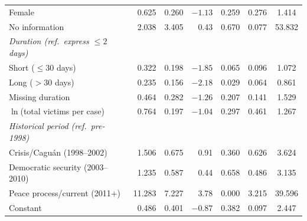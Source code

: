 {\begin{longtable}{@{}l r r r r c c@{}}
Female & 0.625 & 0.260 & $-1.13$ & 0.259 & 0.276 & 1.414 \\
No information & 2.038 & 3.405 & 0.43 & 0.670 & 0.077 & 53.832 \\
\addlinespace
\textit{Duration (ref.\ express $\le 2$ days)} & & & & & & \\
Short ($\le 30$ days) & 0.322 & 0.198 & $-1.85$ & 0.065 & 0.096 & 1.072 \\
Long ($>30$ days) & 0.235 & 0.156 & $-2.18$ & 0.029 & 0.064 & 0.861 \\
Missing duration & 0.464 & 0.282 & $-1.26$ & 0.207 & 0.141 & 1.529 \\
\addlinespace
$\ln$(total victims per case) & 0.764 & 0.197 & $-1.04$ & 0.297 & 0.461 & 1.267 \\
\addlinespace
\textit{Historical period (ref.\ pre-1998)} & & & & & & \\
Crisis/Cagu\'an (1998--2002) & 1.506 & 0.675 & 0.91 & 0.360 & 0.626 & 3.624 \\
Democratic security (2003--2010) & 1.235 & 0.587 & 0.44 & 0.658 & 0.486 & 3.135 \\
Peace process/current (2011+) & 11.283 & 7.227 & 3.78 & 0.000 & 3.215 & 39.596 \\
\addlinespace
Constant & 0.486 & 0.401 & $-0.87$ & 0.382 & 0.097 & 2.447 \\
\midrule


\end{longtable}}
